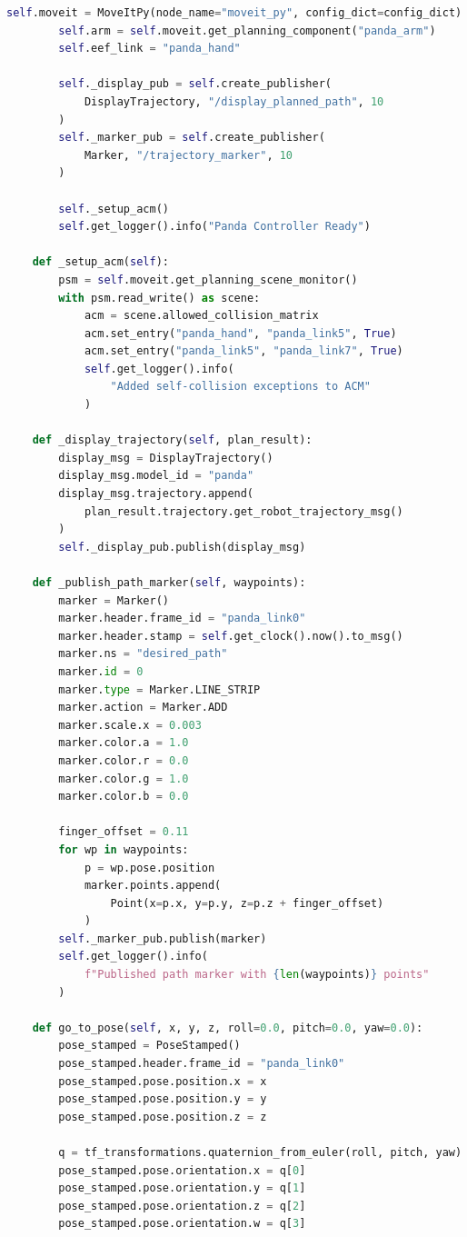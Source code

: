 \documentclass[a4paper,12pt]{ctexart}
\begin{document}
\begin{lstlisting}[language=Python, caption={panda\_controller.py完整源代码}]
        self.moveit = MoveItPy(node_name="moveit_py", config_dict=config_dict)
        self.arm = self.moveit.get_planning_component("panda_arm")
        self.eef_link = "panda_hand"

        self._display_pub = self.create_publisher(
            DisplayTrajectory, "/display_planned_path", 10
        )
        self._marker_pub = self.create_publisher(
            Marker, "/trajectory_marker", 10
        )

        self._setup_acm()
        self.get_logger().info("Panda Controller Ready")

    def _setup_acm(self):
        psm = self.moveit.get_planning_scene_monitor()
        with psm.read_write() as scene:
            acm = scene.allowed_collision_matrix
            acm.set_entry("panda_hand", "panda_link5", True)
            acm.set_entry("panda_link5", "panda_link7", True)
            self.get_logger().info(
                "Added self-collision exceptions to ACM"
            )

    def _display_trajectory(self, plan_result):
        display_msg = DisplayTrajectory()
        display_msg.model_id = "panda"
        display_msg.trajectory.append(
            plan_result.trajectory.get_robot_trajectory_msg()
        )
        self._display_pub.publish(display_msg)

    def _publish_path_marker(self, waypoints):
        marker = Marker()
        marker.header.frame_id = "panda_link0"
        marker.header.stamp = self.get_clock().now().to_msg()
        marker.ns = "desired_path"
        marker.id = 0
        marker.type = Marker.LINE_STRIP
        marker.action = Marker.ADD
        marker.scale.x = 0.003
        marker.color.a = 1.0
        marker.color.r = 0.0
        marker.color.g = 1.0
        marker.color.b = 0.0

        finger_offset = 0.11
        for wp in waypoints:
            p = wp.pose.position
            marker.points.append(
                Point(x=p.x, y=p.y, z=p.z + finger_offset)
            )
        self._marker_pub.publish(marker)
        self.get_logger().info(
            f"Published path marker with {len(waypoints)} points"
        )

    def go_to_pose(self, x, y, z, roll=0.0, pitch=0.0, yaw=0.0):
        pose_stamped = PoseStamped()
        pose_stamped.header.frame_id = "panda_link0"
        pose_stamped.pose.position.x = x
        pose_stamped.pose.position.y = y
        pose_stamped.pose.position.z = z

        q = tf_transformations.quaternion_from_euler(roll, pitch, yaw)
        pose_stamped.pose.orientation.x = q[0]
        pose_stamped.pose.orientation.y = q[1]
        pose_stamped.pose.orientation.z = q[2]
        pose_stamped.pose.orientation.w = q[3]


\end{lstlisting}
\end{document}
